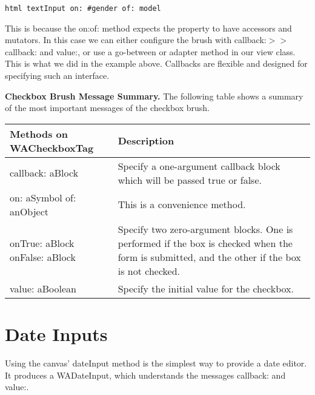 \documentclass[a4paper,10pt,twoside]{book}
\newcommand{\ct}[1]{{\small\ttfamily\textup{#1}}}
\begin{document}
\begin{lstlisting}
html textInput on: #gender of: model
\end{lstlisting}

This is because the  \ct{on:of:} method expects the property to have accessors and mutators. In this case we can either configure the brush with  \ct{callback:$>$$>$callback:} and  \ct{value:}, or use a go-between or adapter method in our view class. This is what we did in the example above. Callbacks are flexible and designed for specifying such an interface.

\textbf{Checkbox Brush Message Summary.} The following table shows a summary of the most important messages of the \ct{checkbox} brush.  


\begin{tabularx}{\textwidth}{lX}
\textbf{Methods on \ct{WACheckboxTag} }&\textbf{Description}\\ \hline
 \index{WACheckboxTag!callback: aBlock} \ct{callback: aBlock} & Specify a one-argument callback block which will be passed true or false.\\
 \index{WACheckboxTag!on: aSymbol of: anObject} \ct{on: aSymbol of: anObject}& This is a convenience method.\\
 \index{WACheckboxTag!onTrue: aBlock onFalse: aBlock} \ct{onTrue: aBlock onFalse: aBlock} & Specify two zero-argument blocks. One is performed if the box is checked when the form is submitted, and the other if the box is not  checked.\\
\index{WACheckboxTag!value: aBoolean} \ct{value: aBoolean}& Specify the initial value for the checkbox. \\
\end{tabularx}

\section{Date Inputs}
\label{book:fundamentals:forms:dateinputs}


Using the canvas' \ct{dateInput} method is the simplest way to provide a date editor. It produces a  \ct{WADateInput}, which understands the messages \ct{callback:} and \ct{value:}.  
\end{document}
